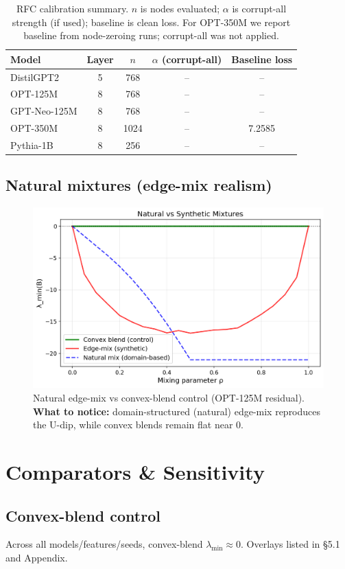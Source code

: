 \documentclass[11pt]{article}
\newcommand{\1}{\mathbf{1}}
\begin{document}
\begin{table}[t]
\centering
\caption{RFC calibration summary. $n$ is nodes evaluated; $\alpha$ is corrupt-all strength (if used); baseline is clean loss. For OPT-350M we report baseline from node-zeroing runs; corrupt-all was not applied.}
\label{tab:rfc_calib}
\begin{tabular}{lcccc}
\toprule
Model & Layer & $n$ & $\alpha$ (corrupt-all) & Baseline loss \\
\midrule
DistilGPT2 & 5 & 768 & -- & -- \\
OPT-125M & 8 & 768 & -- & -- \\
GPT-Neo-125M & 8 & 768 & -- & -- \\
OPT-350M & 8 & 1024 & -- & 7.2585 \\
Pythia-1B & 8 & 256 & -- & -- \\
\bottomrule
\end{tabular}
\end{table}

\subsection{Natural mixtures (edge-mix realism)}
\begin{figure}[t]
\centering
\includegraphics[width=0.75\linewidth]{figs/natural_mix_overlay_facebook_opt-125m_residual_seed0.png}
\caption{Natural edge-mix vs convex-blend control (OPT-125M residual). \textbf{What to notice:} domain-structured (natural) edge-mix reproduces the U-dip, while convex blends remain flat near 0.}
\label{fig:natural_mix}
\end{figure}

\section{Comparators \& Sensitivity}
\FloatBarrier
\subsection{Convex-blend control}
Across all models/features/seeds, convex-blend $\lambda_{\min}\!\approx\!0$. Overlays listed in \S5.1 and Appendix.
\end{document}
